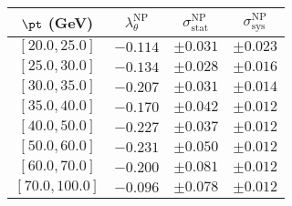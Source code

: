 \begin{tabular}{c||c||c|c}
$\pt$ (GeV) & $\lambda_\theta^{\text{NP}}$ & $\sigma_{\text{stat}}^{\text{NP}}$ & $\sigma_{\text{sys}}^{\text{NP}}$  \\
\hline
$[20.0, 25.0]$& $-0.114$ & $\pm0.031$ & $\pm0.023$\\
$[25.0, 30.0]$& $-0.134$ & $\pm0.028$ & $\pm0.016$\\
$[30.0, 35.0]$& $-0.207$ & $\pm0.031$ & $\pm0.014$\\
$[35.0, 40.0]$& $-0.170$ & $\pm0.042$ & $\pm0.012$\\
$[40.0, 50.0]$& $-0.227$ & $\pm0.037$ & $\pm0.012$\\
$[50.0, 60.0]$& $-0.231$ & $\pm0.050$ & $\pm0.012$\\
$[60.0, 70.0]$& $-0.200$ & $\pm0.081$ & $\pm0.012$\\
$[70.0, 100.0]$& $-0.096$ & $\pm0.078$ & $\pm0.012$\\
\end{tabular}
